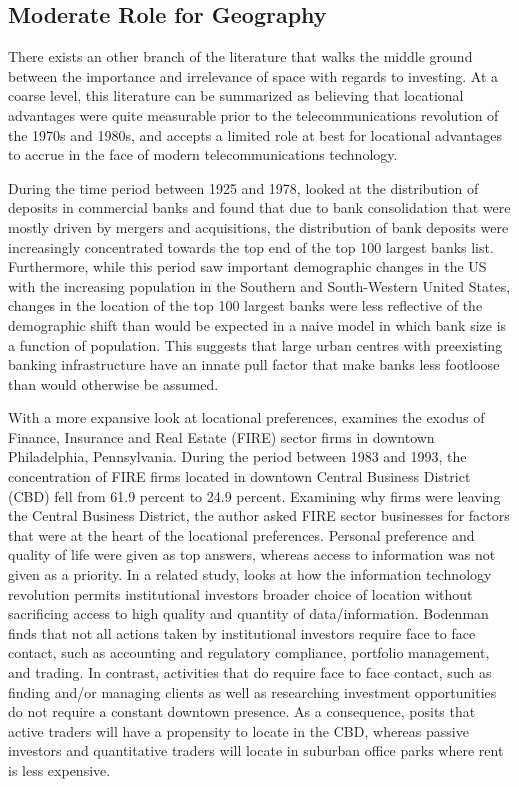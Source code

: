 \subsection{Moderate Role for Geography}
	
There exists an other branch of the literature that walks the middle ground between the importance and irrelevance of space with regards to investing.  At a coarse level, this literature can be summarized as believing that locational advantages were quite measurable prior to the telecommunications revolution of the 1970s and 1980s, and accepts a limited role at best for locational advantages to accrue in the face of modern telecommunications technology.
	
During the time period between 1925 and 1978, \cite{rhoades1982size} looked at the distribution of deposits in commercial banks and found that due to bank consolidation that were mostly driven by mergers and acquisitions, the distribution of bank deposits were increasingly concentrated towards the top end of the top 100 largest banks list. Furthermore, while this period saw important demographic changes in the US with the increasing population in the Southern and South-Western United States, changes in the location of the top 100 largest banks were less reflective of the demographic shift than would be expected in a naive model in which bank size is a function of population.  This suggests that large urban centres with preexisting banking infrastructure have an innate pull factor that make banks less footloose than would otherwise be assumed.  
	
With a more expansive look at locational preferences, \cite{bodenmanthe1998} examines the exodus of  Finance, Insurance and Real Estate (FIRE) sector firms in downtown Philadelphia, Pennsylvania.   During the period between 1983 and 1993, the concentration of FIRE firms located in downtown Central Business District (CBD) fell from 61.9 percent to 24.9 percent.  Examining why firms were leaving the Central Business District, the author asked FIRE sector businesses for factors that were at the heart of the locational preferences.  Personal preference and quality of life were given as top answers, whereas access to information was not given as a priority.  In a related study, \cite{bodenmanfirm2000} looks at how the information technology revolution permits institutional investors broader choice of location without sacrificing access to high quality and quantity of data/information.  Bodenman finds that not all actions taken by institutional investors require face to face contact, such as accounting and regulatory compliance, portfolio management, and trading.  In contrast, activities that do require face to face contact, such as finding and/or managing clients as well as researching investment opportunities do not require a constant downtown presence. As a consequence, \cite{bodenmanfirm2000} posits that active traders will have a propensity to locate in the CBD, whereas passive investors and quantitative traders will locate in suburban office parks where rent is less expensive.  
	
